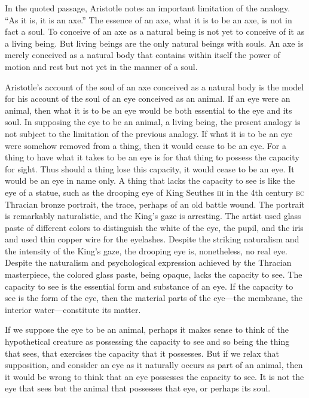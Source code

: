 In the quoted passage, Aristotle notes an important limitation of the analogy. ``As it is, it is an axe.'' The essence of an axe, what it is to be an axe, is not in fact a soul. To conceive of an axe as a natural being is not yet to conceive of it as a living being. But living beings are the only natural beings with souls. An axe is merely conceived as a natural body that contains within itself the power of motion and rest but not yet in the manner of a soul.

Aristotle's account of the soul of an axe conceived as a natural body is the model for his account of the soul of an eye conceived as an animal. If an eye were an animal, then what it is to be an eye would be both essential to the eye and its soul. In supposing the eye to be an animal, a living being, the present analogy is not subject to the limitation of the previous analogy. If what it is to be an eye were somehow removed from a thing, then it would cease to be an eye. For a thing to have what it takes to be an eye is for that thing to possess the capacity for sight. Thus should a thing lose this capacity, it would cease to be an eye. It would be an eye in name only. A thing that lacks the capacity to see is like the eye of a statue, such as the drooping eye of King Seuthes \textsc{iii} in the 4th century \textsc{bc} Thracian bronze portrait, the trace, perhaps of an old battle wound. The portrait is remarkably naturalistic, and the King's gaze is arresting. The artist used glass paste of different colors to distinguish the white of the eye, the pupil, and the iris and used thin copper wire for the eyelashes. Despite the striking naturalism and the intensity of the King's gaze, the drooping eye is, nonetheless, no real eye. Despite the naturalism and psychological expression achieved by the Thracian masterpiece, the colored glass paste, being opaque, lacks the capacity to see. The capacity to see is the essential form and substance of an eye. If the capacity to see is the form of the eye, then the material parts of the eye---the membrane, the interior water---constitute its matter.


If we suppose the eye to be an animal, perhaps it makes sense to think of the hypothetical creature as possessing the capacity to see and so being the thing that sees, that exercises the capacity that it possesses. But if we relax that supposition, and consider an eye as it naturally occurs as part of an animal, then it would be wrong to think that an eye possesses the capacity to see. It is not the eye that sees but the animal that possesses that eye, or perhaps its soul. 

